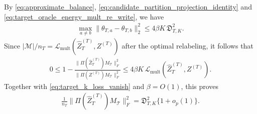 \documentclass[10pt]{article}
\newcommand{\wh}{\widehat}
\newcommand{\calT}{\mathcal T}
\newcommand{\trg}{T}
\newcommand{\nT}{n_{\trg}}
\newcommand{\Ztar}{Z^{(\trg)}}
\newcommand{\thetamcT}[1]{\theta_{\trg,#1}}
\newcommand{\hatZtar}{\wh{Z}^{(\trg)}}
\begin{document}
By \eqref{eq:approximate_balance}, \eqref{eq:candidate_partition_projection_identity} and \eqref{eq:target_oracle_energy_mult_re_write}, we have
\begin{align}
    \max_{a\neq b}\|\thetamcT{a}-\thetamcT{b}\|_2^2
    \le 4\beta K\,\mathfrak D_{\trg,K}^2.
\end{align}
Since $|\mathcal M|/\nT=\mathcal L_{\mathrm{mult}}(\hatZtar_\trg,\Ztar)$ after
the optimal relabeling, it follows that
\begin{align}
    0\le 1-\frac{\|\Pi(\hatZtar_\trg)M_\calT\|_F^2}{\|\Pi(\Ztar)M_\calT\|_F^2}
    \le 4\beta K\,\mathcal L_{\mathrm{mult}}(\hatZtar_\trg,\Ztar).
\end{align}
Together with \eqref{eq:target_k_loss_vanish} and $\beta=O(1)$, this proves
\begin{align}
\label{eq:target_energy_consistency_mult}
\frac{1}{\nT}\|\Pi(\hatZtar_\trg)M_\calT\|_F^2=\mathfrak D_{\trg,K}^2\{1+o_p(1)\}.
\end{align}
\end{document}

